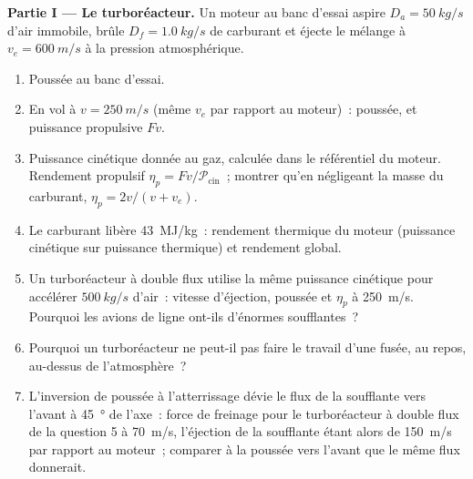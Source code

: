\begin{problem}
\label{pb:b2:flow-balances:1}

\medskip
\noindent\textbf{Partie I --- Le turboréacteur.}
Un moteur au banc d'essai aspire $D_a = \qty{50}{kg/s}$ d'air immobile,
brûle $D_f = \qty{1.0}{kg/s}$ de carburant et éjecte le mélange à $v_e =
\qty{600}{m/s}$ à la pression atmosphérique.
\begin{enumerate}
  \item Poussée au banc d'essai.
  \item En vol à $v = \qty{250}{m/s}$ (même $v_e$ par rapport au
        moteur)~: poussée, et puissance propulsive $Fv$.
  \item Puissance cinétique donnée au gaz, calculée dans le référentiel du moteur.
        Rendement propulsif $\eta_p = Fv/\mathcal P_{\text{cin}}$~; montrer
        qu'en négligeant la masse du carburant, $\eta_p = 2v/(v + v_e)$.
  \item Le carburant libère \qty{43}{MJ/kg}~: rendement thermique du
        moteur (puissance cinétique sur puissance thermique) et rendement global.
  \item Un turboréacteur à double flux utilise la même puissance cinétique pour accélérer
        $\qty{500}{kg/s}$ d'air~: vitesse d'éjection, poussée et $\eta_p$ à
        \qty{250}{m/s}. Pourquoi les avions de ligne ont-ils d'énormes soufflantes~?
  \item Pourquoi un turboréacteur ne peut-il pas faire le travail d'une fusée, au repos,
        au-dessus de l'atmosphère~?
  \item L'inversion de poussée à l'atterrissage dévie le flux de la soufflante vers l'avant à
        \qty{45}{\degree} de l'axe~: force de freinage pour le turboréacteur à double flux
        de la question 5 à \qty{70}{m/s}, l'éjection de la soufflante étant alors de
        \qty{150}{m/s} par rapport au moteur~; comparer à la poussée
        vers l'avant que le même flux donnerait.
\end{enumerate}


\end{problem}
